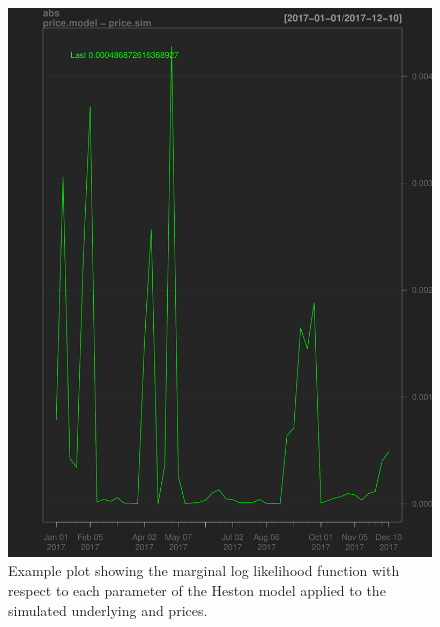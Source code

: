 \documentclass{article}
\begin{document}
\begin{figure}
\includegraphics[scale=0.8]{../figures/Heston_err_price.pdf}
\caption{Example plot showing the marginal log likelihood function with respect to each parameter of the Heston model applied to the simulated underlying and prices.}
\end{figure}
\end{document}
